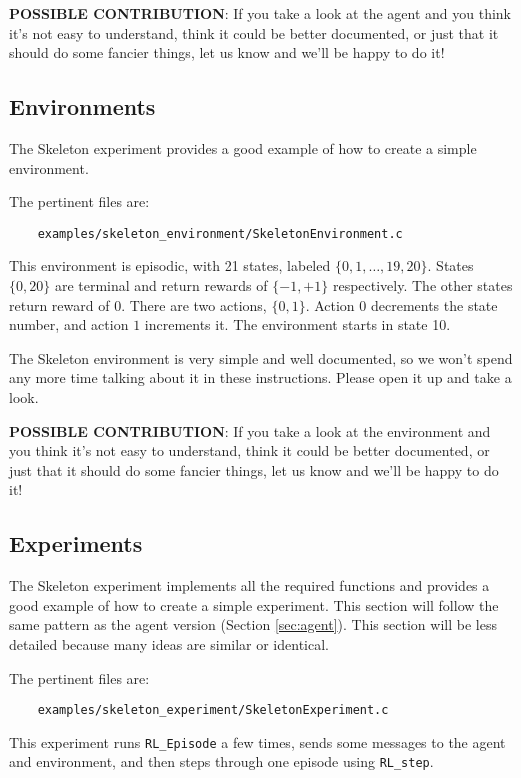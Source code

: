 \documentclass[11pt]{article}
\begin{document}
\textbf{POSSIBLE CONTRIBUTION}: If you take a look at the agent and you think it's not easy to understand, think it could be better documented, 
or just that it should do some fancier things, let us know and we'll be happy to do it!



\subsection{Environments}
The Skeleton experiment provides a good example of how to create a simple environment. 

The pertinent files are:
\begin{verbatim}
	examples/skeleton_environment/SkeletonEnvironment.c
\end{verbatim}

This environment is episodic, with 21 states, labeled $\{0, 1,\ldots,19,20\}$. States $\{0, 20\}$ are terminal and return rewards of $\{-1, +1\}$ respectively.  The other states return reward of $0$.
There are two actions, $\{0, 1\}$.  Action $0$ decrements the state number, and action $1$ increments it. The environment starts in state 10.

The Skeleton environment is very simple and well documented, so we won't spend any more time talking about it in these instructions.
Please open it up and take a look.

\textbf{POSSIBLE CONTRIBUTION}: If you take a look at the environment and you think it's not easy to understand, think it could be better documented, 
or just that it should do some fancier things, let us know and we'll be happy to do it!

\subsection{Experiments}
The Skeleton experiment implements all the required functions and provides a good example of how to create a simple experiment.  This section will follow the same 
pattern as the agent version (Section \ref{sec:agent}).  This section will be less detailed because many ideas are similar or identical.

The pertinent files are:
\begin{verbatim}
	examples/skeleton_experiment/SkeletonExperiment.c
\end{verbatim}

This experiment runs \texttt{RL\_Episode} a few times, sends some messages to the agent and environment, and then steps through one episode using \texttt{RL\_step}.
\end{document}
